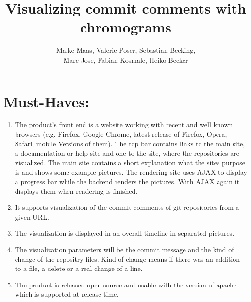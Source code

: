 \documentclass[10pt]{scrartcl}
\author{Maike Maas, Valerie Poser, Sebastian Becking,\\
Marc Jose, Fabian Kosmale, Heiko Becker}
\title{Visualizing commit comments with chromograms}
\begin{document}
\maketitle
\section{Must-Haves:}
\begin{enumerate}
\item The product's front end is a website working with recent and well known browsers (e.g. Firefox, Google Chrome, latest release of Firefox, Opera, Safari, mobile Versions of them). The top bar contains links to the main site, a documentation or help site and one to the site, where the repositories are visualized. The main site contains a short explanation what the sites purpose is and shows some example pictures. The rendering site uses AJAX to display a progress bar while the backend renders the pictures. With AJAX again it displays them when rendering is finished.
\item It supports visualization of the commit comments of git repositories from a given URL.
\item The visualization is displayed in an overall timeline in separated pictures.
\item The visualization parameters will be the commit message and the kind of change of the repositry files. Kind of change means if there was an addition to a file, a delete or a real change of a line.
\item The product is released open source and usable with the version of apache which is supported at release time.
\end{enumerate}
\end{document}
